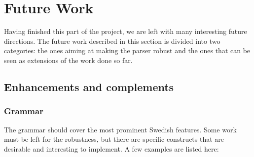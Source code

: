 \documentclass{report}
\begin{document}
\section{Future Work}
\label{sec:future}
Having finished this part of the project, we are left with 
many interesting future directions.
The future work described in this section is divided into two categories:
the ones aiming at making the parser robust and the ones that can be
seen as extensions of the work done so far.
 
\subsection{Enhancements and complements}
\subsubsection{Grammar}
The grammar should cover the most prominent Swedish features.
Some work must be left for the robustness, but there are specific constructs
that are desirable and interesting to implement. A few examples are listed here:\\
\end{document}
